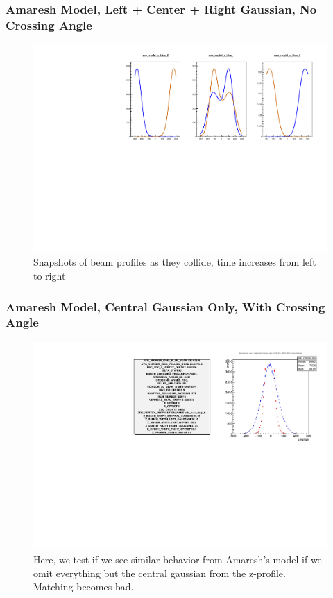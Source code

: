 \begin{frame}
\frametitle{Amaresh Model, Left + Center + Right Gaussian, No Crossing Angle }
\begin{figure}
\begin{center}
\includegraphics[width=\linewidth]{../OverlapTest/figs/359711_model1_angle_zprofile.pdf}
\end{center}
\caption{Snapshots of beam profiles as they collide, time increases from left to right }
\label{fig:359711_model1_angle_zprofile}
\end{figure}
\end{frame}



\begin{frame}
\frametitle{Amaresh Model, Central Gaussian Only, With Crossing Angle }
\begin{figure}
\begin{center}
\includegraphics[width=\linewidth]{../OverlapTest/figs/359711_model0c_angle_vertex.pdf}
\end{center}
\caption{Here, we test if we see similar behavior from Amaresh's model if we
omit everything but the central gaussian from the z-profile. Matching becomes
bad.}
\label{fig:359711_model0c_angle_vertex}
\end{figure}
\end{frame}


